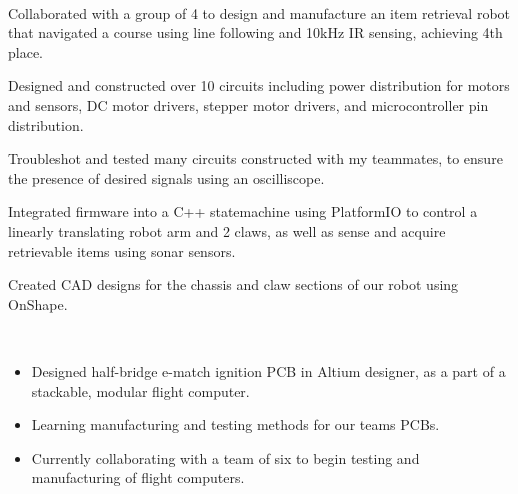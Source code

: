 \documentclass[a4paper]{MagicalCV}
\begin{document}
\begin{minipage}[t]{0.69\textwidth}
 \\
\begin{tightemize}
    \item Collaborated with a group of 4 to design and manufacture an item retrieval robot that navigated a course using line following and 10kHz IR sensing, achieving 4th place.
    \item Designed and constructed over 10 circuits including power distribution for motors and sensors, DC motor drivers, stepper motor drivers, and microcontroller pin distribution.
    \item Troubleshot and tested many circuits constructed with my teammates, to ensure the presence of desired signals using an oscilliscope.
    \item Integrated firmware into a C++ statemachine using PlatformIO to control a linearly translating robot arm and 2 claws, as well as sense and acquire retrievable items using sonar sensors. 
    \item Created CAD designs for the chassis and claw sections of our robot using OnShape.  
\end{tightemize}
\sectionsep


 \\
\begin{itemize}
    \item Designed half-bridge e-match ignition PCB in Altium designer, as a part of a stackable, modular flight computer.
    \item Learning manufacturing and testing methods for our teams PCBs.   
    \item Currently collaborating with a team of six to begin testing and manufacturing of flight computers.
\end{itemize} 
\sectionsep

\end{minipage} 
\end{document}
